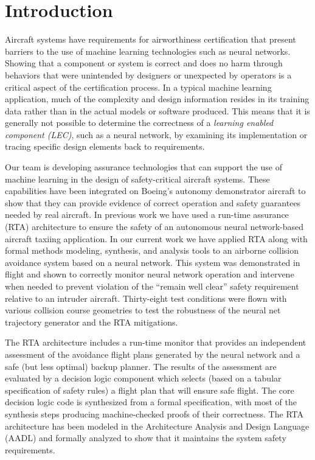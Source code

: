 \section{Introduction}

Aircraft systems have requirements for airworthiness certification that present barriers to the use
of machine learning technologies such as neural networks. Showing that a component or system is
correct and does no harm through behaviors that were unintended by designers or unexpected by
operators is a critical aspect of the certification process. In a typical machine learning
application, much of the complexity and design information resides in its training data rather than
in the actual models or software produced. This means that it is generally not possible to determine
the correctness of a {\em learning enabled component (LEC)}, such as a neural network, 
by examining its implementation or tracing specific design
elements back to requirements.

Our team is developing assurance technologies that can support the use of machine learning in the
design of safety-critical aircraft systems. These capabilities have been integrated on Boeing's
autonomy demonstrator aircraft to show that they can provide evidence of correct operation and
safety guarantees needed by real aircraft. In previous work \cite{dasc2020} we have used a run-time assurance
(RTA) architecture to ensure the safety of an autonomous neural network-based aircraft taxiing
application. In our current work we have applied RTA along with formal methods
modeling, synthesis, and analysis tools to an airborne collision avoidance system based on a neural network.
This system was demonstrated in flight and shown to correctly monitor neural network operation and
intervene when needed to prevent violation of the ``remain well clear'' safety requirement relative to
an intruder aircraft. Thirty-eight test conditions were flown with various collision course
geometries
to test the robustness of the neural net trajectory generator and
the RTA mitigations.

The RTA architecture includes a run-time monitor that provides an independent assessment of the
avoidance flight plans generated by the neural network and a safe (but less optimal) backup planner.
The results of the assessment are evaluated by a decision logic component which selects (based on a
tabular specification of safety rules) a flight plan that will ensure safe flight. The core decision
logic code is synthesized from a formal specification, with most of the synthesis steps producing
machine-checked proofs of their correctness. The RTA architecture has been modeled in the
Architecture Analysis and Design Language (AADL) and formally analyzed to show that it maintains the
system safety requirements.


